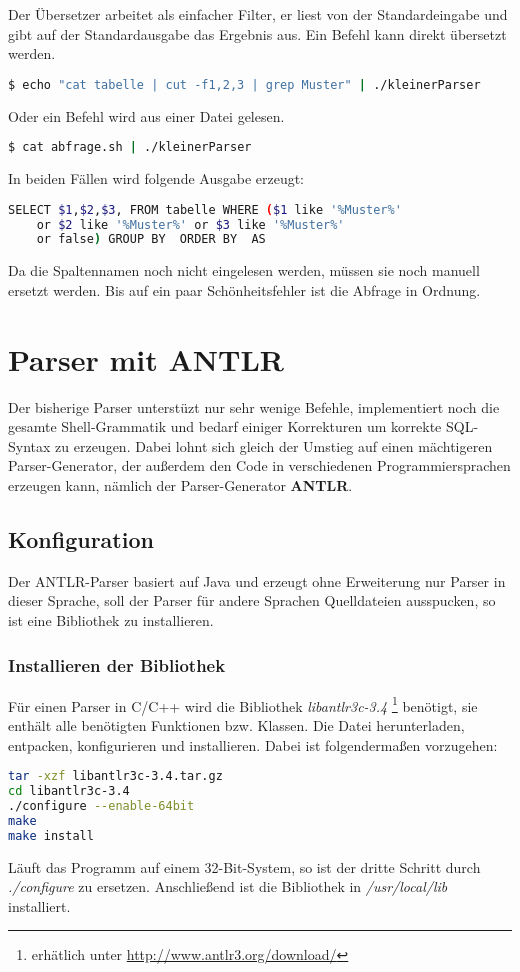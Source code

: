 Der Übersetzer arbeitet als einfacher Filter, er liest von der Standardeingabe und gibt auf der Standardausgabe das Ergebnis aus. Ein Befehl kann direkt übersetzt werden.

\begin{lstlisting}[language=Bash]
$ echo "cat tabelle | cut -f1,2,3 | grep Muster" | ./kleinerParser
\end{lstlisting}

Oder ein Befehl wird aus einer Datei gelesen.
\begin{lstlisting}[language=Bash]
$ cat abfrage.sh | ./kleinerParser
\end{lstlisting}

In beiden Fällen wird folgende Ausgabe erzeugt:
\begin{lstlisting}[language=Bash]
SELECT $1,$2,$3, FROM tabelle WHERE ($1 like '%Muster%'
	or $2 like '%Muster%' or $3 like '%Muster%' 
	or false) GROUP BY  ORDER BY  AS
\end{lstlisting}

Da die Spaltennamen noch nicht eingelesen werden, müssen sie noch manuell ersetzt werden. Bis auf ein paar Schönheitsfehler ist die Abfrage in Ordnung.

\chapter{Parser mit ANTLR}
Der bisherige Parser unterstüzt nur sehr wenige Befehle, implementiert noch die gesamte Shell-Grammatik und bedarf einiger Korrekturen um korrekte SQL-Syntax zu erzeugen. Dabei lohnt sich gleich der Umstieg auf einen mächtigeren Parser-Generator, der außerdem den Code in verschiedenen Programmiersprachen erzeugen kann, nämlich der Parser-Generator \textbf{ANTLR}.
\section{Konfiguration}
Der ANTLR-Parser basiert auf Java und erzeugt ohne Erweiterung nur Parser in dieser Sprache, soll der Parser für andere Sprachen Quelldateien ausspucken, so ist eine Bibliothek zu installieren.

\subsection{Installieren der Bibliothek}
Für einen Parser in C/C++ wird die Bibliothek \textit{libantlr3c-3.4 }
\footnote{\label{foot:1}erhätlich unter \url{http://www.antlr3.org/download/}}
benötigt, sie enthält alle benötigten Funktionen bzw. Klassen.
Die Datei herunterladen, entpacken, konfigurieren und installieren. Dabei ist folgendermaßen vorzugehen:
\begin{lstlisting}[language=Bash]
tar -xzf libantlr3c-3.4.tar.gz
cd libantlr3c-3.4
./configure --enable-64bit
make
make install
\end{lstlisting}
Läuft das Programm auf einem 32-Bit-System, so ist der dritte Schritt durch \textit{./configure} zu ersetzen. Anschließend ist die Bibliothek in \textit{/usr/local/lib} installiert.

